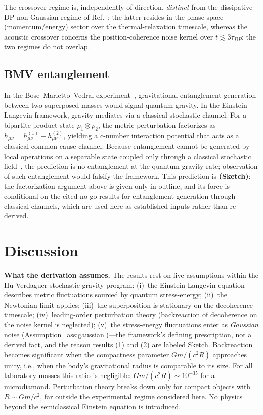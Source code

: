 \documentclass[12pt,a4paper]{article}
\theoremstyle{remark}
\begin{document}
The crossover regime is, independently of direction, \emph{distinct} from the
dissipative-DP non-Gaussian regime of Ref.~\cite{melo_dissipative}: the latter resides in
the phase-space (momentum/energy) sector over the thermal-relaxation timescale, whereas the
acoustic crossover concerns the position-coherence noise kernel over $t\lesssim
3\tau_{DP}$; the two regimes do not overlap.

\subsection{BMV entanglement}

In the Bose--Marletto--Vedral experiment~\cite{bose,marletto_vedral}, gravitational
entanglement generation between two superposed masses would signal quantum gravity. In the
Einstein-Langevin framework, gravity mediates via a classical stochastic channel. For a
bipartite product state $\rho_1\otimes\rho_2$, the metric perturbation factorizes as
$h_{\mu\nu} = h^{(1)}_{\mu\nu} + h^{(2)}_{\mu\nu}$, yielding a c-number interaction
potential that acts as a classical common-cause channel. Because entanglement cannot
be generated by local operations on a separable state coupled only through a classical
stochastic field~\cite{kafri,oppenheim,marletto_classical}, the prediction is no
entanglement at the quantum gravity rate; observation of such entanglement would falsify
the framework. This prediction is \textbf{(Sketch)}: the factorization argument above is
given only in outline, and its force is conditional on the cited no-go results for
entanglement generation through classical channels, which are used here as established
inputs rather than re-derived.

\section{Discussion}
\label{sec:discussion}

\textbf{What the derivation assumes.} The results rest on five assumptions within
the Hu-Verdaguer stochastic gravity program: (i)~the Einstein-Langevin equation describes
metric fluctuations sourced by quantum stress-energy; (ii)~the Newtonian limit applies;
(iii)~the superposition is stationary on the decoherence timescale; (iv)~leading-order
perturbation theory (backreaction of decoherence on the noise kernel is neglected);
(v)~the stress-energy fluctuations enter as \emph{Gaussian} noise
(Assumption~\ref{ass:gaussian})---the framework's defining prescription, not a derived
fact, and the reason results (1) and (2) are labeled Sketch.
Backreaction becomes significant when the compactness parameter $Gm/(c^2 R)$ approaches
unity, i.e., when the body's gravitational radius is comparable to its size. For all
laboratory masses this ratio is negligible: $Gm/(c^2 R) \sim 10^{-35}$ for a
microdiamond. Perturbation theory breaks down only for compact objects with
$R \sim Gm/c^2$, far outside the experimental regime considered here.
No physics beyond the semiclassical Einstein equation is introduced.
\end{document}
